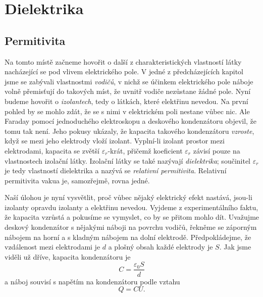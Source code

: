 \setchaptertoc
\chapter{Dielektrika}\label{fyz:IIchapX}
  \section{Permitivita}\label{fyz:IIchapXsecI}

    Na tomto místě začneme hovořit o další z charakteristických vlastností látky nacházející se pod
    vlivem elektrického pole. V jedné z předcházejících kapitol jsme se zabývali vlastnostmi
    \emph{vodičů}, v nichž se účinkem elektrického pole náboje volně přemisťují do takových míst, že
    uvnitř vodiče nezůstane žádné pole. Nyní budeme hovořit o \emph{izolantech}, tedy o látkách,
    které elektřinu nevedou. Na první pohled by se mohlo zdát, že se s nimi v elektrickém poli
    nestane vůbec nic. Ale Faraday pomocí jednoduchého elektroskopu a deskového kondenzátoru
    objevil, že tomu tak není. Jeho pokusy ukázaly, že kapacita takového kondenzátoru
    \emph{vzroste}, když se mezi jeho elektrody vloží izolant. Vyplní-li izolant prostor mezi
    elektrodami, kapacita se zvětší \(\varepsilon_r\)-krát, přičemž koeficient \(\varepsilon_r\)
    závisí pouze na vlastnostech izolační látky. Izolační látky se také nazývají \emph{dielektrika};
    součinitel \(\varepsilon_r\) je tedy vlastností dielektrika a nazývá se \emph{relativní
    permitivita}. Relativní permitivita vakua je, samozřejmě, rovna jedné.  

    Naší úlohou je nyní vysvětlit, proč vůbec nějaký elektrický efekt nastává, jsou-li izolanty
    opravdu izolanty a elektřinu nevedou. Vyjdeme z experimentálního faktu, že kapacita vzrůstá a
    pokusíme se vymyslet, co by se přitom mohlo dít. Uvažujme deskový kondenzátor s nějakými náboji
    na povrchu vodičů, řekněme se záporným nábojem na horní a s kladným nábojem na dolní elektrodě.
    Předpokládejme, že vzdálenost mezi elektrodami je \(d\) a plošný obsah každé elektrody je \(S\).
    Jak jsme viděli už dříve, kapacita kondenzátoru je
    \begin{equation}\label{fyz:eq907}
      C = \dfrac{\varepsilon_0S}{d}
    \end{equation}
    a náboj souvisí s napětím na kondenzátoru podle vztahu
    \begin{equation}\label{fyz:eq908}
      Q = CU.
    \end{equation}

